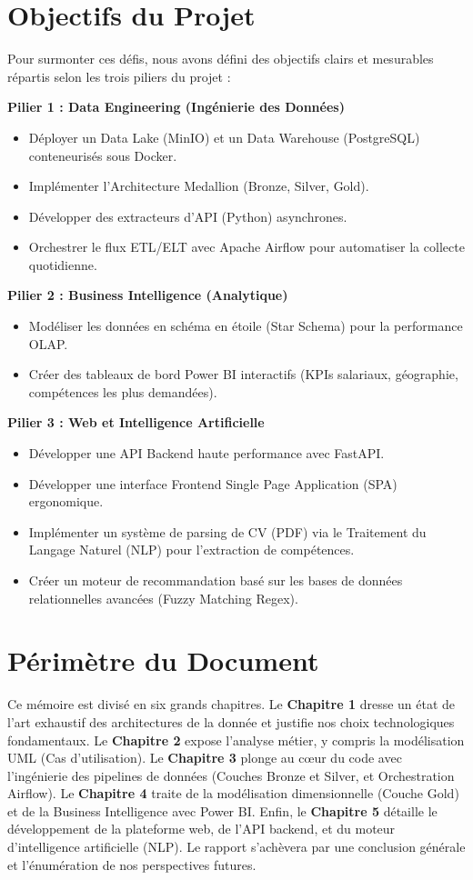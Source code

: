 \documentclass[12pt,a4paper,twoside]{report}
\begin{document}
\section{Objectifs du Projet}
Pour surmonter ces défis, nous avons défini des objectifs clairs et mesurables répartis selon les trois piliers du projet :

\textbf{Pilier 1 : Data Engineering (Ingénierie des Données)}
\begin{itemize}
    \item Déployer un Data Lake (MinIO) et un Data Warehouse (PostgreSQL) conteneurisés sous Docker.
    \item Implémenter l'Architecture Medallion (Bronze, Silver, Gold).
    \item Développer des extracteurs d'API (Python) asynchrones.
    \item Orchestrer le flux ETL/ELT avec Apache Airflow pour automatiser la collecte quotidienne.
\end{itemize}

\textbf{Pilier 2 : Business Intelligence (Analytique)}
\begin{itemize}
    \item Modéliser les données en schéma en étoile (Star Schema) pour la performance OLAP.
    \item Créer des tableaux de bord Power BI interactifs (KPIs salariaux, géographie, compétences les plus demandées).
\end{itemize}

\textbf{Pilier 3 : Web et Intelligence Artificielle}
\begin{itemize}
    \item Développer une API Backend haute performance avec FastAPI.
    \item Développer une interface Frontend Single Page Application (SPA) ergonomique.
    \item Implémenter un système de parsing de CV (PDF) via le Traitement du Langage Naturel (NLP) pour l'extraction de compétences.
    \item Créer un moteur de recommandation basé sur les bases de données relationnelles avancées (Fuzzy Matching Regex).
\end{itemize}

\section{Périmètre du Document}
Ce mémoire est divisé en six grands chapitres. Le \textbf{Chapitre 1} dresse un état de l'art exhaustif des architectures de la donnée et justifie nos choix technologiques fondamentaux. Le \textbf{Chapitre 2} expose l'analyse métier, y compris la modélisation UML (Cas d'utilisation). Le \textbf{Chapitre 3} plonge au cœur du code avec l'ingénierie des pipelines de données (Couches Bronze et Silver, et Orchestration Airflow). Le \textbf{Chapitre 4} traite de la modélisation dimensionnelle (Couche Gold) et de la Business Intelligence avec Power BI. Enfin, le \textbf{Chapitre 5} détaille le développement de la plateforme web, de l'API backend, et du moteur d'intelligence artificielle (NLP). Le rapport s'achèvera par une conclusion générale et l'énumération de nos perspectives futures.
\end{document}

